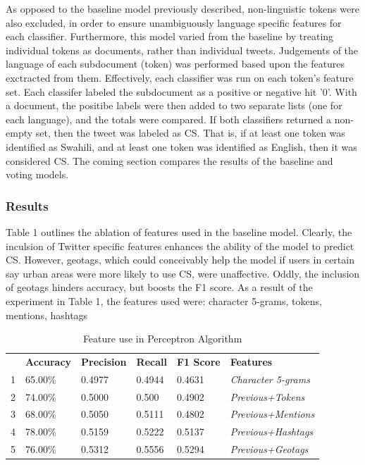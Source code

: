 \documentclass[12pt]{article}\usepackage[]{graphicx}\usepackage[]{color}
\begin{document}
As opposed to the baseline model previously described, non-linguistic tokens were also excluded, in order to ensure unambiguously language specific features for each classifier. Furthermore, this model varied from the baseline by treating individual tokens as documents, rather than individual tweets. Judgements of the language of each subdocument (token) was performed based upon the features exctracted from them. Effectively, each classifier was run on each token's feature set. Each classifer labeled the subdocument as a positive or negative hit '0'. With a document, the positibe labels were then added to two separate lists (one for each language), and the totals were compared. If both classifiers returned a non-empty set, then the tweet was labeled as CS. That is, if at least one token was identified as Swahili, and at least one token was identified as English, then it was considered CS. The coming section compares the results of the baseline and voting models.

\subsubsection{Results}

Table 1 outlines the ablation of features used in the baseline model. Clearly, the inculsion of Twitter specific features enhances the ability of the model to predict CS. However, geotags, which could conceivably help the model if users in certain say urban areas were more likely to use CS, were unaffective. Oddly, the inclusion of geotags hinders accuracy, but boosts the F1 score. As a result of the experiment in Table 1, the features used were: character 5-grams, tokens, mentions, hashtags

\begin{table}[h]
\caption{Feature use in Perceptron Algorithm}
\centering
\begin{tabular}{llllll}
\cline{2-6}
  & \textbf{Accuracy} & \textbf{Precision} & \textbf{Recall} &
                                                               \textbf{F1 Score} & \textbf{Features}          \\ \cline{2-6} 
1 & 65.00\%     & 0.4977             & 0.4944          & 0.4631            & \textit{Character 5-grams} \\ \cline{2-6} 
2 & 74.00\%     & 0.5000             & 0.500           & 0.4902            & \textit{Previous+Tokens}   \\ \cline{2-6} 
3 & 68.00\%     & 0.5050             & 0.5111          & 0.4802            & \textit{Previous+Mentions} \\ \cline{2-6} 
4 & 78.00\%     & 0.5159             & 0.5222          & 0.5137            & \textit{Previous+Hashtags} \\ \cline{2-6} 
5 & 76.00\%     & 0.5312             & 0.5556          & 0.5294            & \textit{Previous+Geotags} 
\end{tabular}
\end{table}
\end{document}

